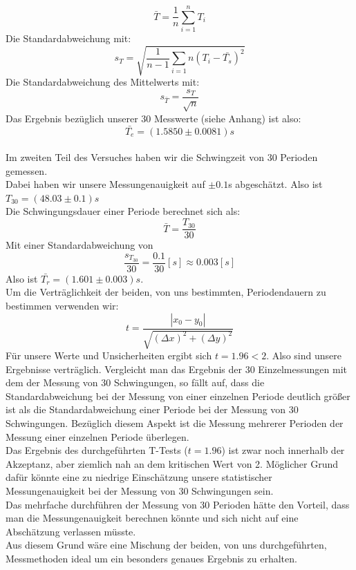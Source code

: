\documentclass[11pt,a4paper]{article}
\begin{document}
	\begin{equation}
	\bar{T} = \frac{1}{n} \sum_{i=1}^{n} T_i
	\end{equation}
	Die Standardabweichung mit:
	\begin{equation}
	s_T=\sqrt{\frac{1}{n-1}\sum_{i=1}{n} (T_i - \bar{T_s})^2}
	\end{equation}
	Die Standardabweichung des Mittelwerts mit:
	\begin{equation}
	s_{\bar{T}}=\frac{s_T}{\sqrt{n}}
	\end{equation}
	Das Ergebnis bezüglich unserer 30 Messwerte (siehe Anhang) ist also:
	\begin{equation*}
	\bar{T_e}=(1.5850 \pm 0.0081)s
	\end{equation*}
	\\ \newpage
	Im zweiten Teil des Versuches haben wir die Schwingzeit von 30 Perioden gemessen. \\
	Dabei haben wir unsere Messungenauigkeit auf $\pm 0.1$s abgeschätzt. Also ist $T_{30}=(48.03\pm 0.1)s$
	\\
	Die Schwingungsdauer einer Periode berechnet sich als:
	\begin{equation*}
	\bar{T}=\frac{T_{30}}{30}
	\end{equation*}
	Mit einer Standardabweichung von $$\frac{s_{T_{30}}}{30}=\frac{0.1}{30}[s]\approx 0.003[s]$$
	Also ist $\bar{T_r}=(1.601\pm 0.003)s$. \\
	Um die Verträglichkeit der beiden, von uns bestimmten, Periodendauern zu bestimmen verwenden wir:
	\begin{equation}
	t=\frac{ |x_0 -y_0|}{\sqrt{(\Delta x)^2 + (\Delta y)^2}}
	\end{equation}
	Für unsere Werte und Unsicherheiten ergibt sich $t=1.96<2$. Also sind unsere Ergebnisse verträglich.
	\newpage
	Vergleicht man das Ergebnis der 30 Einzelmessungen mit dem der Messung von 30 Schwingungen,
	so fällt auf, dass die Standardabweichung bei der Messung von einer einzelnen Periode deutlich
	größer ist als die Standardabweichung einer Periode bei der Messung von 30 Schwingungen.
	Bezüglich diesem Aspekt ist die Messung mehrerer Perioden der Messung einer einzelnen Periode überlegen.
	\\
	Das Ergebnis des durchgeführten T-Tests ($t=1.96$) ist zwar noch innerhalb der Akzeptanz, aber
	ziemlich nah an dem kritischen Wert von 2.
	Möglicher Grund dafür könnte eine zu niedrige Einschätzung unsere statistischer Messungenauigkeit bei der Messung von 30 Schwingungen sein.
	\\Das mehrfache durchführen der Messung von 30 Perioden hätte den Vorteil, dass man die Messungenauigkeit berechnen könnte und sich nicht auf eine Abschätzung verlassen müsste.
	\\
	Aus diesem Grund wäre eine Mischung der beiden, von uns durchgeführten, Messmethoden ideal um ein
	besonders genaues Ergebnis zu erhalten.
\end{document}
